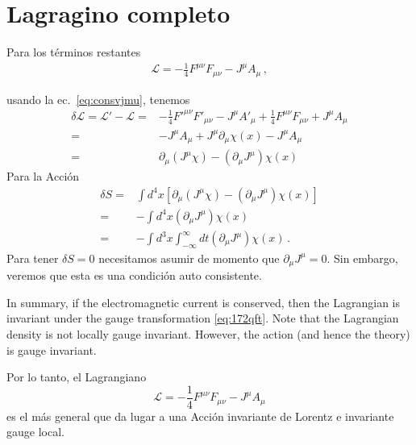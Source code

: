 \section{Lagragino completo}



 Para los 
términos restantes
\begin{align}
    \mathcal{L}=-\frac{1}{4}F^{\mu\nu}F_{\mu\nu}-J^\mu A_\mu\,,
\end{align}

 usando la ec.~\eqref{eq:consvjmu}, tenemos
\begin{align}
  \delta\mathcal{L}=\mathcal{L}'-\mathcal{L}=&
-\frac{1}{4}{F'}^{\mu\nu}F'_{\mu\nu}-J^\mu A'_\mu+\frac{1}{4}F^{\mu\nu}F_{\mu\nu}+J^\mu A_\mu\nonumber\\
=&-J^\mu A_\mu+J^\mu\partial_\mu\chi(x)-J^\mu A_\mu\nonumber\\
=&\partial_\mu(J^\mu\chi)-(\partial_\mu J^\mu)\chi(x)
\end{align}
Para la Acción
\begin{align}
  \delta S=&\int d^4x \left[\partial_\mu(J^\mu\chi)-(\partial_\mu J^\mu)\chi(x)\right]\nonumber\\
=&-\int d^4x (\partial_\mu J^\mu)\chi(x)\nonumber\\
=&-\int d^3x\int_{-\infty}^\infty dt (\partial_\mu J^\mu)\chi(x)\,.
\end{align}
Para tener $\delta S=0$ necesitamos asumir de momento que
$\partial_\mu J^\mu=0$. Sin embargo, veremos que esta es una condición
auto consistente.



In summary, if the electromagnetic current is conserved, then the Lagrangian is invariant under the gauge transformation \eqref{eq:172qft}. Note that the Lagrangian density is not locally gauge invariant. However, the action (and hence the theory) is gauge invariant.

\begin{frame}
Por lo tanto, el Lagrangiano
\begin{equation}
  \label{eq:lagAmum}
  \mathcal{L}=-\frac{1}{4}F^{\mu\nu}F_{\mu\nu}-J^\mu A_\mu
\end{equation}
es el más general que da lugar a una Acción invariante de Lorentz e invariante gauge
local. 

\end{frame}

